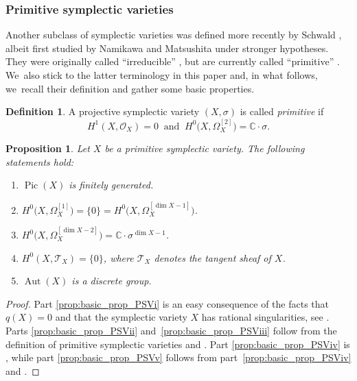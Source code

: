 \documentclass[JEP,XML,SOM,Unicode,published]{cedram}
\theoremstyle{plain}
\newtheorem{prop}[thm]{Proposition}
\theoremstyle{definition}
\newtheorem{dfn}[thm]{Definition}
\newcommand{\C}{\mathbb{C}}
\newcommand{\OO}{\mathcal{O}}
\DeclareMathOperator{\Aut}{Aut}
\DeclareMathOperator{\Pic}{Pic}
\begin{document}
\subsubsection{Primitive symplectic varieties}

Another subclass of symplectic varieties was defined more recently by Schwald \cite{Schwald20}, albeit first studied by Namikawa and Matsushita under stronger hypotheses. They were originally called \enquote{irreducible} \cite{Schwald20}, but are currently called \enquote{primitive} \cite{BL22}. We~also stick to the latter terminology in this paper and, in what follows, we~recall their definition and gather some basic properties.

\begin{dfn}
\label{dfn:PSV}
A projective symplectic variety $(X,\sigma)$ is called \emph{primitive} if
\[
H^1(X,\OO_X) = 0 \ \text{ and } \ H^0 \bigl(X, \Omega_X^{[2]} \bigr) = \C \cdot \sigma.
\]
\end{dfn}

\begin{prop}
\label{prop:basic_prop_PSV}
Let $X$ be a primitive symplectic variety. The following statements hold:
\begin{enumerate}
\itemsep 2pt

\item\label{prop:basic_prop_PSVi}
$\Pic(X)$ is finitely generated.

\item\label{prop:basic_prop_PSVii}
$H^0 \bigl(X,\Omega_X^{[1]} \bigr) = \{ 0 \} = H^0 \bigl(X,\Omega_X^{[\dim X - 1]} \bigr)$.

\item\label{prop:basic_prop_PSViii}
$H^0 \bigl(X,\Omega_X^{[\dim X - 2]} \bigr) = \C \cdot \sigma^{\dim X -1}$.

\item\label{prop:basic_prop_PSViv}
$H^0(X,\mathscr{T}_X) = \{ 0 \}$, where $\mathscr{T}_X$ denotes the tangent sheaf of $X$.

\item\label{prop:basic_prop_PSVv}
$\Aut(X)$ is a discrete group.
\end{enumerate}
\end{prop}

\begin{proof}
Part \eqref{prop:basic_prop_PSVi} is an easy consequence of the facts that $q(X) = 0$ and that the symplectic variety $X$ has rational singularities, see \cite[Prop.\,1.3]{Beauville00a}. Parts \eqref{prop:basic_prop_PSVii} and~\eqref{prop:basic_prop_PSViii} follow from the definition of primitive symplectic varieties and \cite[Prop.\,6.9 \& Cor.\,6.10]{GKP16b}. Part \eqref{prop:basic_prop_PSViv} is \cite[Lem.\,4.6]{BL22}, while part \eqref{prop:basic_prop_PSVv} follows from part~\eqref{prop:basic_prop_PSViv} and \cite[Lem.\,3.4]{MO67}.
\end{proof}
\end{document}
